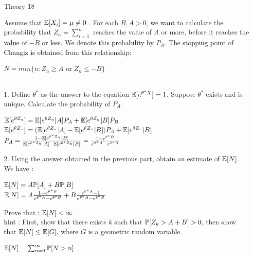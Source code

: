 \documentclass[30pt]{article}
\begin{document}
{\Large \color{blue} Theory 18 } \\
{\color{blue} Assume that $\Bbb{E}[X_i] = \mu \neq 0 $ . For each $B,A > 0$, we want to calculate the probability that $Z_n = \sum_{i=1}^{n} $ reaches the value of $A$ or more, before it reaches the value of $-B$ or less. We denote this probability by $P_A$. The stopping point of Changiz is obtained from this relationship: \\ 
\begin{center}
    $N = min \{ n : Z_n \ge A $ or $Z_n \le -B \}$
\end{center}
} \\ \newline  
{\color{blue} {\large 1. }Define $\theta^*$ as the answer to the equation $\Bbb{E}[e^{\theta^* X}] = 1 $. Suppose $\theta^*$ exists and is unique. Calculate the probability of $P_A$. } \\ \newline
\begin{center}
    $\Bbb{E}[e^{\theta Z_n}] = \Bbb{E}[e^{\theta Z_n} | A]P_A + \Bbb{E}[e^{\theta Z_n} | B]P_B $ \vspace{0.2cm}\\
    $\Bbb{E}[e^{\theta Z_n}] = (\Bbb{E}[e^{\theta Z_n} | A] - \Bbb{E}[e^{\theta Z_n} | B])P_A + \Bbb{E}[e^{\theta Z_n} | B] $ \vspace{0.2cm} \\
    $P_A = \frac{1 - \Bbb{E}[e^{\theta^* Z_n} | B]}{\Bbb{E}[e^{\theta^* Z_n} | A] - \Bbb{E}[e^{\theta^* Z_n} | B]} = \frac{1 - e^{\theta^* B}}{e^{\theta^* A} - e^{\theta^* B}}$
\end{center}

{\color{blue} {\large 2.} Using the answer obtained in the previous part, obtain an estimate of $\Bbb{E}[N]$. } \\ \newline
We have : 
\begin{center}
    $\Bbb{E}[N] = A \Bbb{P}[A] + B \Bbb{P}[B] $ \vspace{0.3cm}\\
    $\Bbb{E}[N] = A \frac{1 - e^{\theta^* B}}{e^{\theta^* A} -e^{\theta^* B} } + B \frac{e^{\theta^* A} - 1}{e^{\theta^* A} - e^{\theta^* B}}  $
\end{center} 

{\color{blue}{\large 3.} Prove that : \hspace{0.3cm} $\Bbb{E}[N] < \infty $ } \\ 
{\small \color{blue} hint : First, show that there exists $k$ such that $\Bbb{P}[Z_k > A+B] > 0$, then show that $\Bbb{E}[N] \le \Bbb{E}[G] $, where $G$ is a geometric random variable. } \\ \newline
\begin{center}
    $\Bbb{E}[N] = \sum_{n=0}^{\infty} \Bbb{P}[N > n] $ 
\end{center} 
\end{document}

